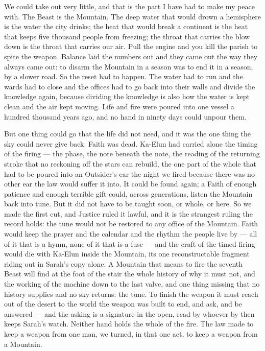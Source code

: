 We could take out very little, and that is the part I have had to make my peace with. The Beast is the Mountain. The deep water that would drown a hemisphere is the water the city drinks; the heat that would break a continent is the heat that keeps five thousand people from freezing; the throat that carries the blow down is the throat that carries our air. Pull the engine and you kill the parish to spite the weapon. Balance laid the numbers out and they came out the way they always came out: to disarm the Mountain in a season was to end it in a season, by a slower road. So the reset had to happen. The water had to run and the wards had to close and the offices had to go back into their walls and divide the knowledge again, because dividing the knowledge is also how the water is kept clean and the air kept moving. Life and fire were poured into one vessel a hundred thousand years ago, and no hand in ninety days could unpour them.\par

But one thing could go that the life did not need, and it was the one thing the sky could never give back. Faith was dead. Ka-Elun had carried alone the timing of the firing --- the phase, the note beneath the note, the reading of the returning stroke that no reckoning off the stars can rebuild, the one part of the whole that had to be poured into an Outsider's ear the night we fired because there was no other ear the law would suffer it into. It could be found again; a Faith of enough patience and enough terrible gift could, across generations, listen the Mountain back into tune. But it did not have to be taught soon, or whole, or here. So we made the first cut, and Justice ruled it lawful, and it is the strangest ruling the record holds: the tune would not be restored to any office of the Mountain. Faith would keep the prayer and the calendar and the rhythm the people live by --- all of it that is a hymn, none of it that is a fuse --- and the craft of the timed firing would die with Ka-Elun inside the Mountain, its one reconstructable fragment riding out in Sarah's copy alone. A Mountain that means to fire the seventh Beast will find at the foot of the stair the whole history of why it must not, and the working of the machine down to the last valve, and one thing missing that no history supplies and no sky returns: the tune. To finish the weapon it must reach out of the desert to the world the weapon was built to end, and ask, and be answered --- and the asking is a signature in the open, read by whoever by then keeps Sarah's watch. Neither hand holds the whole of the fire. The law made to keep a weapon from one man, we turned, in that one act, to keep a weapon from a Mountain.\par


